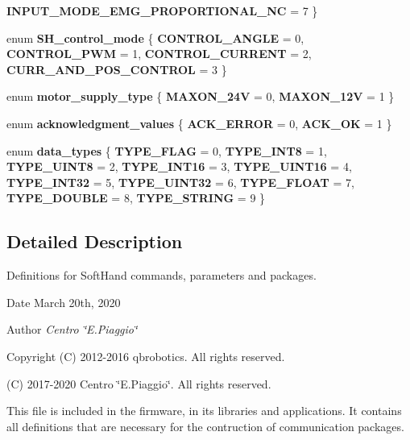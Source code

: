 \begin{DoxyCompactItemize}
\textbf{ I\+N\+P\+U\+T\+\_\+\+M\+O\+D\+E\+\_\+\+E\+M\+G\+\_\+\+P\+R\+O\+P\+O\+R\+T\+I\+O\+N\+A\+L\+\_\+\+NC} = 7
 \}
\item 
enum \textbf{ S\+H\+\_\+control\+\_\+mode} \{ \textbf{ C\+O\+N\+T\+R\+O\+L\+\_\+\+A\+N\+G\+LE} = 0, 
\textbf{ C\+O\+N\+T\+R\+O\+L\+\_\+\+P\+WM} = 1, 
\textbf{ C\+O\+N\+T\+R\+O\+L\+\_\+\+C\+U\+R\+R\+E\+NT} = 2, 
\textbf{ C\+U\+R\+R\+\_\+\+A\+N\+D\+\_\+\+P\+O\+S\+\_\+\+C\+O\+N\+T\+R\+OL} = 3
 \}
\item 
\mbox{\label{commands_8h_acde12dc57054fb8f859ec0625cb45ec8}} 
enum {\bfseries motor\+\_\+supply\+\_\+type} \{ {\bfseries M\+A\+X\+O\+N\+\_\+24V} = 0, 
{\bfseries M\+A\+X\+O\+N\+\_\+12V} = 1
 \}
\item 
\mbox{\label{commands_8h_a0eae1c82d20671c5d0b9b82b10070f1b}} 
enum {\bfseries acknowledgment\+\_\+values} \{ {\bfseries A\+C\+K\+\_\+\+E\+R\+R\+OR} = 0, 
{\bfseries A\+C\+K\+\_\+\+OK} = 1
 \}
\item 
\mbox{\label{commands_8h_aee7544e5fa6e2843ecdc3609602e56aa}} 
enum {\bfseries data\+\_\+types} \{ \newline
{\bfseries T\+Y\+P\+E\+\_\+\+F\+L\+AG} = 0, 
{\bfseries T\+Y\+P\+E\+\_\+\+I\+N\+T8} = 1, 
{\bfseries T\+Y\+P\+E\+\_\+\+U\+I\+N\+T8} = 2, 
{\bfseries T\+Y\+P\+E\+\_\+\+I\+N\+T16} = 3, 
\newline
{\bfseries T\+Y\+P\+E\+\_\+\+U\+I\+N\+T16} = 4, 
{\bfseries T\+Y\+P\+E\+\_\+\+I\+N\+T32} = 5, 
{\bfseries T\+Y\+P\+E\+\_\+\+U\+I\+N\+T32} = 6, 
{\bfseries T\+Y\+P\+E\+\_\+\+F\+L\+O\+AT} = 7, 
\newline
{\bfseries T\+Y\+P\+E\+\_\+\+D\+O\+U\+B\+LE} = 8, 
{\bfseries T\+Y\+P\+E\+\_\+\+S\+T\+R\+I\+NG} = 9
 \}
\end{DoxyCompactItemize}


\subsection{Detailed Description}
Definitions for Soft\+Hand commands, parameters and packages. 

\begin{DoxyDate}{Date}
March 20th, 2020 
\end{DoxyDate}
\begin{DoxyAuthor}{Author}
{\itshape Centro \char`\"{}\+E.\+Piaggio\char`\"{}} 
\end{DoxyAuthor}
\begin{DoxyCopyright}{Copyright}
(C) 2012-\/2016 qbrobotics. All rights reserved. 

(C) 2017-\/2020 Centro \char`\"{}\+E.\+Piaggio\char`\"{}. All rights reserved.
\end{DoxyCopyright}
This file is included in the firmware, in its libraries and applications. It contains all definitions that are necessary for the contruction of communication packages.

